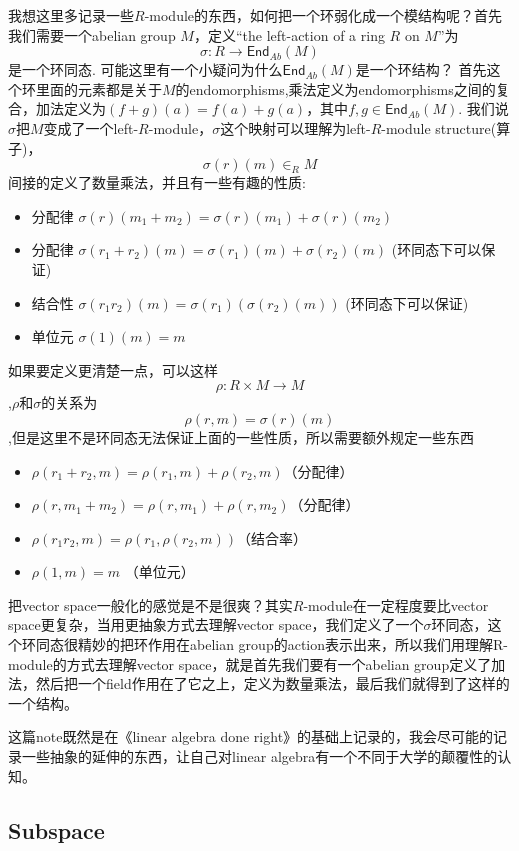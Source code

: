 \documentclass{article}
\newcommand*{\xfunc}[4]{{#2}\colon{#3}{#1}{#4}}
\newcommand*{\func}[3]{\xfunc{\to}{#1}{#2}{#3}}
\begin{document}
我想这里多记录一些$R$-module的东西，如何把一个环弱化成一个模结构呢？首先我们需要一个abelian group $M$，定义“the left-action of a ring $R$ on $M$”为\[\func{\sigma}{R}{\textsf{End}_{Ab}(M)}\]是一个环同态. 可能这里有一个小疑问为什么$\textsf{End}_{Ab}(M)$是一个环结构？ 首先这个环里面的元素都是关于$M$的endomorphisms,乘法定义为endomorphisms之间的复合，加法定义为$(f+g)(a)=f(a)+g(a)$，其中$f,g \in \textsf{End}_{Ab}(M)$. 我们说$\sigma$把$M$变成了一个left-$R$-module，$\sigma$这个映射可以理解为left-$R$-module structure(算子)，\[\sigma(r)(m) \in _{R}M\]间接的定义了数量乘法，并且有一些有趣的性质:

\begin{itemize}
	\item 分配律 $\sigma(r)(m_1+m_2)=\sigma(r)(m_1)+\sigma(r)(m_2)$ 
	\item 分配律 $\sigma(r_1+r_2)(m)=\sigma(r_1)(m)+\sigma(r_2)(m)$ (环同态下可以保证)
	\item 结合性 $\sigma(r_1r_2)(m)=\sigma(r_1)(\sigma(r_2)(m))$ (环同态下可以保证)
	\item 单位元 $\sigma(1)(m)=m$
\end{itemize}

如果要定义更清楚一点，可以这样\[\func{\rho}{R \times M}{M}\],$\rho$和$\sigma$的关系为\[\rho(r,m)=\sigma(r)(m)\],但是这里不是环同态无法保证上面的一些性质，所以需要额外规定一些东西

\begin{itemize}
	\item $\rho(r_1+r_2,m)=\rho(r_1,m)+\rho(r_2,m)$（分配律）
	\item $\rho(r,m_1+m_2)=\rho(r,m_1)+\rho(r,m_2)$（分配律）
	\item $\rho(r_1r_2,m) = \rho(r_1,\rho(r_2,m))$（结合率）
	\item $\rho(1,m) = m$ （单位元）
\end{itemize}

把vector space一般化的感觉是不是很爽？其实$R$-module在一定程度要比vector space更复杂，当用更抽象方式去理解vector space，我们定义了一个$\sigma$环同态，这个环同态很精妙的把环作用在abelian group的action表示出来，所以我们用理解R-module的方式去理解vector space，就是首先我们要有一个abelian group定义了加法，然后把一个field作用在了它之上，定义为数量乘法，最后我们就得到了这样的一个结构。

这篇note既然是在《linear algebra done right》的基础上记录的，我会尽可能的记录一些抽象的延伸的东西，让自己对linear algebra有一个不同于大学的颠覆性的认知。


\newpage
\subsection{Subspace}
\end{document}
